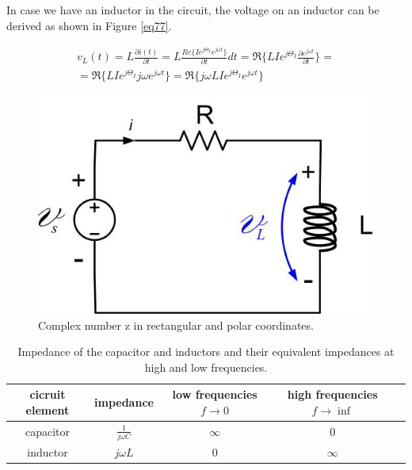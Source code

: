 \documentclass{ximera}
\begin{document}
In case we have an inductor in the circuit, the voltage on an inductor can be derived as shown in Figure \ref{eq77}. 


\begin{eqnarray}
v_L(t) = L \frac{\partial{ i(t)}}{\partial t}  =L  \frac{ Re\{    I e^{j \Theta_I} e^{j \omega t}\}}{\partial t}  dt  = \Re\{  LI e^{j \Theta_I} \frac{ \partial e^{j \omega t}}{\partial t} \} =  \nonumber \\ = \Re\{  LI e^{j  \Theta_I}  j  \omega e^{j \omega t} \} =  \Re \{  j  \omega       LI e^{j  \Theta_I}    e^{j \omega t}   \}      \label{eq77} 
\end{eqnarray}


\begin{figure}[htbp]
\begin{center}
\includegraphics[scale=0.3]{../jpg/RLnew.jpg}
\end{center}
\caption{Complex number z in rectangular and polar coordinates.}
\label{RLcirc}
\end{figure}







\begin{table}
\centering
\begin{tabular}{|c|c|c|c|c|} \hline
cicruit element & impedance & low frequencies $f \to 0$& high frequencies $f \to \inf$   \\  \hline  
 capacitor     & $\frac{1}{j \omega C}$    & $\infty$ & $0$    \\  \hline       
 inductor & $j \omega L$              &    $0$   &       $\infty $             \\ \hline
\end{tabular}
\caption{Impedance of the capacitor and inductors and their equivalent impedances at high and low frequencies.}
\end{table}
\end{document}
